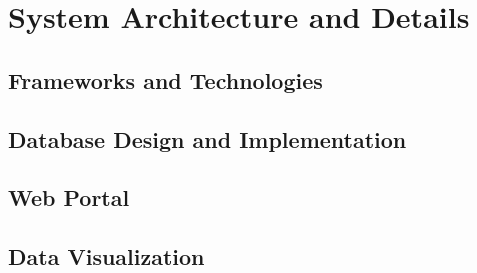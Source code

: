 \chapter{System Architecture and Details}
\label{ChapterFive}

\section{Frameworks and Technologies}
\label{FrameworksAndTechnologies}

\section{Database Design and Implementation}
\label{DatabaseDesignandImplementation}

\section{Web Portal}
\label{WebPrtal}

\section{Data Visualization}
\label{DataVisualization}

